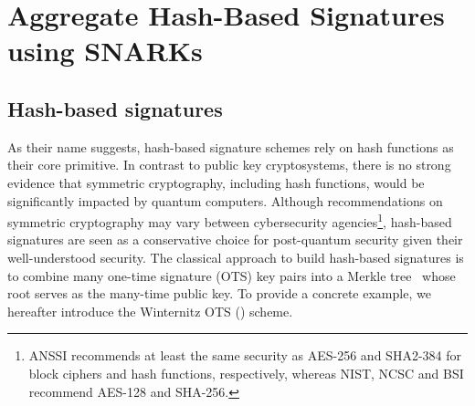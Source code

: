 \section{Aggregate Hash-Based Signatures using SNARKs}
\subsection{Hash-based signatures}
As their name suggests, hash-based signature schemes rely on hash functions as their core primitive.
In contrast to public key cryptosystems, there is no strong evidence that symmetric cryptography, including hash functions, would be significantly impacted by quantum computers.
Although recommendations on symmetric cryptography may vary between cybersecurity agencies\footnote{ANSSI recommends at least the same security as \textsf{AES-256} and \textsf{SHA2-384} for block ciphers and hash functions, respectively, whereas NIST, NCSC and BSI recommend \textsf{AES-128} and \textsf{SHA-256}.}, hash-based signatures are seen as a conservative choice for post-quantum security given their well-understood security.
The classical approach to build hash-based signatures is to combine many one-time signature (OTS) key pairs into a Merkle tree~\cite{10.5555/909000} whose root serves as the many-time public key.
To provide a concrete example, we hereafter introduce the Winternitz OTS (\WOTS) scheme. 

\newpage
